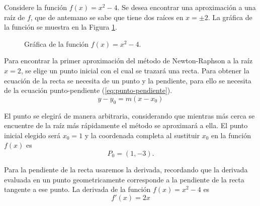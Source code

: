 \begin{exerciseT}
	Considere la función $f(x)=x^2-4$. Se desea encontrar una aproximación a una raíz de $f$, que de antemano se sabe
	que tiene dos raíces en $x=\pm 2$. La gráfica de la función se muestra en la Figura \ref{fig:NewtonRaphson01}.

	\begin{figure}[H]
		\centering
		\caption{Gráfica de la función $f(x)=x^2-4$.}
		\label{fig:NewtonRaphson01}
	\end{figure}

	Para encontrar la primer aproximación del método de Newton-Raphson a la raíz $x=2$, se elige un punto
	inicial con el cual se trazará una recta. Para obtener la ecuación de la recta se necesita de un punto y
	la pendiente, para ello se necesita de la ecuación punto-pendiente (\ref{eq:punto-pendiente}).
	\begin{equation}
		y-y_0 = m(x-x_0)
		\label{eq:punto-pendiente}
	\end{equation}

	El punto se elegirá de manera arbitraria, considerando que mientras más cerca se encuentre de la raíz más
	rápidamente el método se aproximará a ella. El punto inicial elegido será $x_0=1$ y la coordenada completa 
	al sustituir $x_0$ en la función $f(x)$ es \[P_0 = (1, -3).\]

	Para la pendiente de la recta usaremos la derivada, recordando que la derivada evaluada en un punto geometricamente 
	corresponde a la pendiente de la recta tangente a ese punto. La derivada de la función $f(x)=x^2-4$ es 
	\begin{equation}
		f'(x) = 2x
		\label{ex:NewtonRaphson02}
	\end{equation}


\end{exerciseT}
